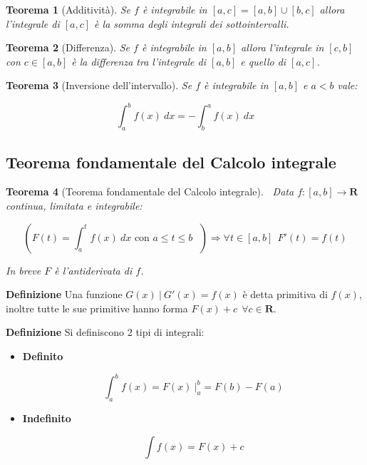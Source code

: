 \documentclass{article}
\newtheorem{theorem}{Teorema}
\begin{document}
\begin{theorem}[Additività]
    Se $f$ è integrabile in $[a,c]=[a,b]\cup[b,c]$ allora l'integrale di $[a,c]$ è la somma degli integrali dei sottointervalli.\newline
    
\end{theorem}

\begin{theorem}[Differenza]
    Se $f$ è integrabile in $[a,b]$ allora l'integrale in $[c,b]$ con $c\in[a,b]$ è la differenza tra l'integrale di $[a,b]$ e quello di $[a,c]$.\newline
    
\end{theorem}

\begin{theorem}[Inversione dell'intervallo]
    Se $f$ è integrabile in $[a,b]$ e $a<b$ vale:
    
    $$\int_a^bf(x)\ dx=-\int_b^af(x)\ dx$$\newline
    
\end{theorem}

\subsection{Teorema fondamentale del Calcolo integrale}

\begin{theorem}[Teorema fondamentale del Calcolo integrale]$\ $\newline
    Data $f:[a,b]\rightarrow\mathbf{R}$ continua, limitata e integrabile:

    $$\left(F(t)=\int_a^tf(x)\ dx\text{ con $a\leq t\leq b$ }\right)\Rightarrow\forall t\in[a,b]\ \  F'(t)=f(t)$$

\noindent In breve $F$ è l'antiderivata di $f$.\newline
    
\end{theorem}

\noindent\textbf{Definizione} Una funzione $G(x)\ |\ G'(x)=f(x)$ è detta primitiva di $f(x)$, inoltre tutte le sue primitive hanno forma $F(x)+c\ \ \forall c\in\mathbf{R}$.\newline

\newpage

\noindent\textbf{Definizione} Si definiscono 2 tipi di integrali:
    \begin{itemize}
        \item \textbf{Definito}

            $$\int_a^bf(x)=F(x)\ |_a^b=F(b)-F(a)$$
        
        \item \textbf{Indefinito}

            $$\int f(x)=F(x)+c$$\newline
        
    \end{itemize}
\end{document}
